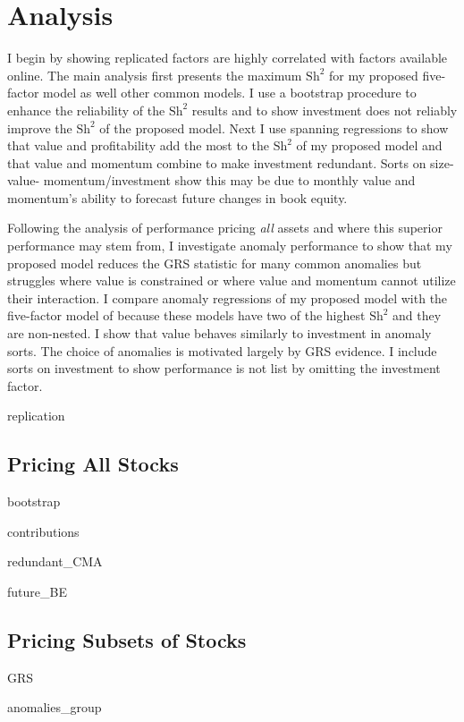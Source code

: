 
\section{Analysis}

I begin by showing replicated factors are highly correlated with factors available online.
The main analysis first presents the maximum $\text{Sh}^2$ for my proposed five-factor
model as well other common models. I use a bootstrap procedure to enhance the reliability
of the $\text{Sh}^2$ results and to show investment does not reliably improve the
$\text{Sh}^2$ of the proposed model. Next I use spanning regressions to show that value
and profitability add the most to the $\text{Sh}^2$ of my proposed model and that value
and momentum combine to make investment redundant. Sorts on size-value-
momentum/investment show this may be due to monthly value and momentum's ability to
forecast future changes in book equity.

Following the analysis of performance pricing \emph{all} assets and where this superior
performance may stem from, I investigate anomaly performance to show that my proposed
model reduces the GRS statistic for many common anomalies but struggles where value is
constrained or where value and momentum cannot utilize their interaction. I compare
anomaly regressions of my proposed model with the five-factor model of
\textcite{fama2016dissecting} because these models have two of the highest $\text{Sh}^2$
and they are non-nested. I show that value behaves similarly to investment in anomaly
sorts. The choice of anomalies is motivated largely by GRS evidence. I include sorts on
investment to show performance is not list by omitting the investment factor.

{replication}

\subsection{Pricing All Stocks}

{bootstrap}

{contributions}

{redundant_CMA}

{future_BE}

\subsection{Pricing Subsets of Stocks}

{GRS}

{anomalies_group}
